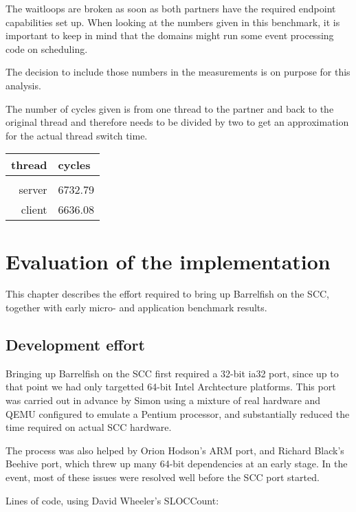 \documentclass[a4paper,twoside]{report} %
\begin{document}
The waitloops are broken as soon as both partners have the required
endpoint capabilities set up. When looking at the numbers given in
this benchmark, it is important to keep in mind that the domains might
run some event processing code on scheduling.

The decision to include those numbers in the measurements is on
purpose for this analysis.

The number of cycles given is from one thread to the partner and back
to the original thread and therefore needs to be divided by two to get
an approximation for the actual thread switch time.

\begin{center}
\begin{tabular}{rl}
thread & cycles \\
\hline \\
server & 6732.79\\
client & 6636.08\\
\end{tabular}
\end{center}


\chapter{Evaluation of the implementation}\label{chap:eval}

This chapter describes the effort required to bring up Barrelfish on
the SCC, together with early micro- and application benchmark
results. 

\section{Development effort}

Bringing up Barrelfish on the SCC first required a 32-bit ia32 port,
since up to that point we had only targetted 64-bit Intel Archtecture
platforms.  This port was carried out in advance by Simon using a
mixture of real hardware and QEMU configured to emulate a Pentium
processor, and substantially reduced the time required on actual SCC
hardware. 

The process was also helped by Orion Hodson's ARM port, and Richard
Black's Beehive port, which threw up many 64-bit dependencies at an
early stage.  In the event, most of these issues were resolved well
before the SCC port started. 

Lines of code, using David Wheeler's SLOCCount:
\end{document}
